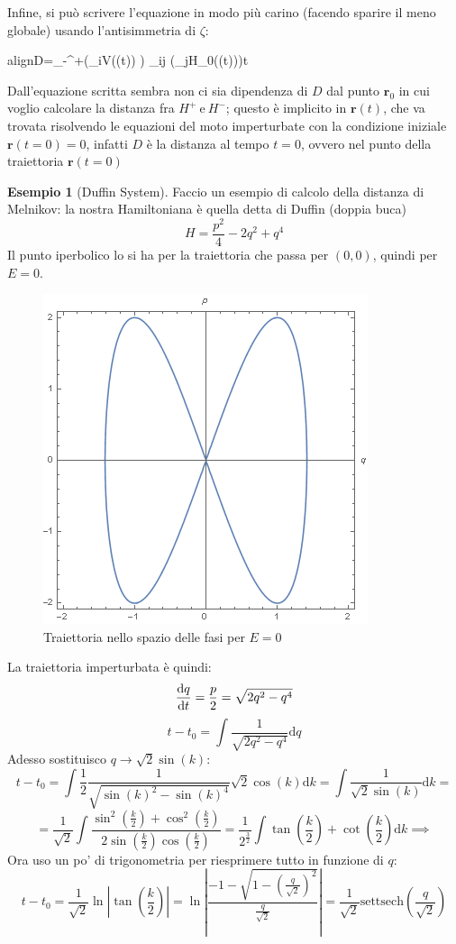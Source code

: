 \documentclass[a4paper,12pt]{article}
\newcommand{\boxedeq}[2]{\begin{empheq}[box={\fboxsep=6pt\fbox}]{align}\label{#1}#2\end{empheq}}
\theoremstyle{plain}
\renewcommand{\vec}[1]{{\boldsymbol{#1}}}
\theoremstyle{definition}
\newtheorem{exmp}{Esempio}[section]
\newcommand{\f}[2]{\frac{#1}{#2}}
\renewcommand{\d}{\text{d}}
\newcommand{\econg}{~\text{e}~}
\newcommand{\rpos}{\vec{r}}
\theoremstyle{remark}
\begin{document}
 Infine, si può scrivere l'equazione in modo più carino (facendo sparire il meno globale) usando l'antisimmetria di $\zeta$:
 \boxedeq{Melnikov}{D=\int_{-\infty}^{+\infty}\epsilon\left(\partial_i{V}(\rpos(t)) \right)	\zeta_{ij} \left(\partial_jH_0(\rpos(t))\right)\d t}
 \begin{obs}
Dall'equazione scritta sembra non ci sia dipendenza di $D$ dal punto $\rpos_0$ in cui voglio calcolare la distanza fra $H^+\econg H^-$; questo è implicito in $\rpos(t)$, che va trovata risolvendo le equazioni del moto imperturbate con la condizione iniziale $\rpos(t=0)=0$, infatti $D$ è la distanza al tempo $t=0$, ovvero nel punto della traiettoria $\rpos(t=0)$

\end{obs}
 
 \begin{exmp}[Duffin System]
 	Faccio un esempio di calcolo della distanza di Melnikov:
 	la nostra Hamiltoniana è quella detta di Duffin (doppia buca)
 	\[H=\f{p^2}{4}-2q^2+q^4\]
 	Il punto iperbolico lo si ha per la traiettoria che passa per $(0,0)$, quindi per $E=0$.
 	\begin{figure}[h]\centering\includegraphics[scale=0.4]{Duffin}
 		\caption{Traiettoria nello spazio delle fasi per $E=0$}
 \label{Duffin}	
 \end{figure}
 	La traiettoria imperturbata è quindi:
 	\[\dv{q}{t}=\f{p}{2}=\sqrt{2q^2-q^4}	\]
 	 \[t-t_0=\int\f{1}{\sqrt{2q^2-q^4}}\d q\]
 	 Adesso sostituisco $q\rightarrow \sqrt{2}\sin(k)$:
 	 \[t-t_0=\int	\f{1}{2}\f{1}{\sqrt{\sin(k)^2-\sin(k)^4}} \sqrt{2} \cos(k) \d k=\int \f{1}{\sqrt{2}\sin(k)}\d k=\]\[=\f{1}{\sqrt{2}}\int \f{\sin^2\left(\f{k}{2}\right)+\cos^2\left(\f{k}{2}\right)}{2\sin\left(\f{k}{2}\right)\cos\left(\f{k}{2}\right)}=	\f{1}{2^\f{3}{2}}\int \tan\left(\f{k}{2}\right)+\cot\left(\f{k}{2}\right)\d k\implies\]
 	 Ora uso un po' di trigonometria per riesprimere tutto in funzione di $q$:
 	 \[t-t_0=\f{1}{\sqrt{2}}\ln\left|\tan\left(\f{k}{2}\right)\right|=\ln\left|\f{-1-\sqrt{1-\left(\f{q}{\sqrt{2}}\right)^2}}{\f{q}{\sqrt{2}}}\right|=\f{1}{\sqrt{2}}\text{settsech}\left(\f{q}{\sqrt{2}}\right)\]
 	 

\end{exmp}
\end{document}
